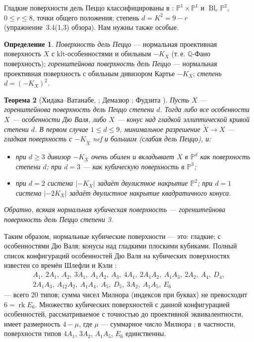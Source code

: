 \documentclass[11pt,a4paper]{article}
\theoremstyle{plain}
\newtheorem{theorem}{Теорема}[section]
\theoremstyle{definition}
\newtheorem{definition}[theorem]{Определение}
\theoremstyle{remark}
\newcommand{\Q}{\mathbb{Q}}
\newcommand{\PP}{\mathbb{P}}
\DeclareMathOperator{\Bl}{Bl}
\DeclareMathOperator{\rk}{rk}
\begin{document}
Гладкие поверхности дель Пеццо классифицированы в \cite[гл.~8]{Do}: $\PP^1\times\PP^1$ и
$\Bl_r\PP^2$, $0\le r\le8$, точки общего положения; степень $d=K^2=9-r$ (упражнение~3.4(1,3)
обзора). Нам нужны также особые.

\begin{definition}
\emph{Поверхность дель Пеццо} --- нормальная проективная поверхность $X$ с klt-особенностями и
обильным $-K_X$ (т.\,е. $\Q$-Фано поверхность); \emph{горенштейнова поверхность дель Пеццо} ---
нормальная проективная поверхность с обильным дивизором Картье $-K_X$; \emph{степень}
$d=(-K_X)^2$.
\end{definition}

\begin{theorem}[{Хидака--Ватанабе, \cite{HW}; Демазюр \cite{De}; Фудзита \cite{Fuj90}}]\label{thm:Gor-dP}
Пусть $X$ --- горенштейнова поверхность дель Пеццо степени $d$. Тогда либо все особенности $X$ ---
особенности Дю Валя, либо $X$ --- конус над гладкой эллиптической кривой степени $d$. В первом
случае $1\le d\le9$, минимальное разрешение $\tilde X\to X$ --- гладкая поверхность с
$-K_{\tilde X}$ nef и большим \textup{(}слабая дель Пеццо\textup{)}, и:
\begin{itemize}
\item при $d\ge3$ дивизор $-K_X$ очень обилен и вкладывает $X$ в $\PP^d$ как поверхность
степени $d$; при $d=3$ --- как кубическую поверхность в $\PP^3$;
\item при $d=2$ система $|-K_X|$ задаёт двулистное накрытие $\PP^2$; при $d=1$ система $|-2K_X|$
задаёт двулистное накрытие квадратичного конуса.
\end{itemize}
Обратно, всякая нормальная кубическая поверхность --- горенштейнова поверхность дель Пеццо степени 3.
\end{theorem}

Таким образом, нормальные кубические поверхности --- это: гладкие; с особенностями Дю Валя;
конусы над гладкими плоскими кубиками. Полный список конфигураций особенностей Дю Валя на кубических
поверхностях известен со времён Шлефли и Кэли \cite{BW}:
\[
\begin{array}{l}
A_1,\ 2A_1,\ A_2,\ 3A_1,\ A_1A_2,\ A_3,\ 4A_1,\ 2A_1A_2,\ A_1A_3,\ 2A_2,\ A_4,\ D_4,\\
2A_1A_3,\ A_12A_2,\ A_1A_4,\ A_5,\ D_5,\ 3A_2,\ A_1A_5,\ E_6
\end{array}
\]
--- всего 20 типов; сумма чисел Милнора (индексов при буквах) не превосходит $6=\rk E_6$. Множество
кубических поверхностей с данной конфигурацией особенностей, рассматриваемое с точностью до
проективной эквивалентности, имеет размерность $4-\mu$, где $\mu$ --- суммарное число Милнора
\cite{BW}; в частности, поверхности типов $4A_1$, $3A_2$, $A_1A_5$, $E_6$ единственны.
\end{document}
